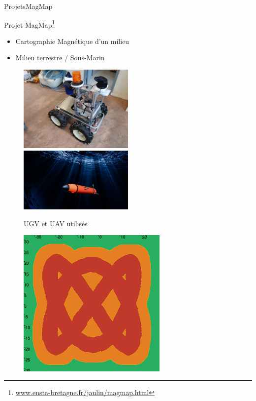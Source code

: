 \begin{frame}{Projets}{MagMap}
    \begin{minipage}{0.48\textwidth}
        \begin{block}{Projet MagMap\footnote{\url{www.ensta-bretagne.fr/jaulin/magmap.html}}}
            \begin{itemize}
                \item Cartographie Magnétique d'un milieu \\
                \item Milieu terrestre / Sous-Marin \\
            \end{itemize}
        \end{block}
        \begin{figure}
                \includegraphics[width=0.5\textwidth]{images/project_magmap/saturne.jpg}
                \includegraphics[width=0.5\textwidth]{images/project_magmap/riptide.jpg}
            \caption{UGV et UAV utilisés}
        \end{figure}
    \end{minipage}
    \hfill
    \begin{minipage}{0.48\textwidth}
        \begin{figure}
            \includegraphics[width=0.65\textwidth]{images/project_magmap/mapping_lissajous.png}

\end{figure}
\end{minipage}
\end{frame}
